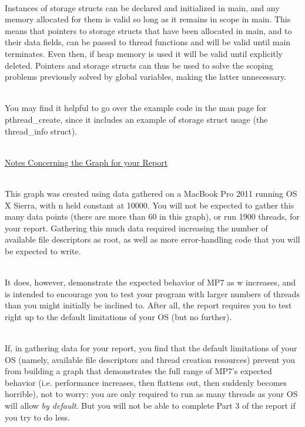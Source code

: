 \documentclass[12pt]{extarticle}
\begin{document}
	\ \\
	Instances of storage structs can be declared and initialized in main, and any memory allocated for them is valid so long as it remains in scope in main. This means that pointers to storage structs that have been allocated in main, and to their data fields, can be passed to thread functions and will be valid until main terminates. Even then, if heap memory is used it will be valid until explicitly deleted. Pointers and storage structs can thus be used to solve the scoping problems previously solved by global variables, making the latter unnecessary.

	\ \\
	You may find it helpful to go over the example code in the man page for pthread\_create, since it includes an example of storage struct usage (the thread\_info struct).

\newpage
\noindent
\ \\
{\large \underline{Notes Concerning the Graph for your Report}}
\ \\

        \ \\
        This graph was created using data gathered on a MacBook Pro 2011 running OS X Sierra, with n held constant at 10000. You will not be expected to gather this many data points (there are more than 60 in this graph), or run 1900 threads, for your report. Gathering this much data required increasing the number of available file descriptors as root, as well as more error-handling code that you will be expected to write.
        
        \ \\
        It does, however, demonstrate the expected behavior of MP7 as w increases, and is intended to encourage you to test your program with larger numbers of threads than you might initially be inclined to. After all, the report requires you to test right up to the default limitations of your OS (but no further).
        
        \ \\
        If, in gathering data for your report, you find that the default limitations of your OS (namely, available file descriptors and thread creation resources) prevent you from building a graph that demonstrates the full range of MP7's expected behavior (i.e. performance increases, then flattens out, then suddenly becomes horrible), not to worry: you are only required to run as many threads as your OS will allow \emph{by default}. But you will not be able to complete Part 3 of the report if you try to do less.
\end{document}
